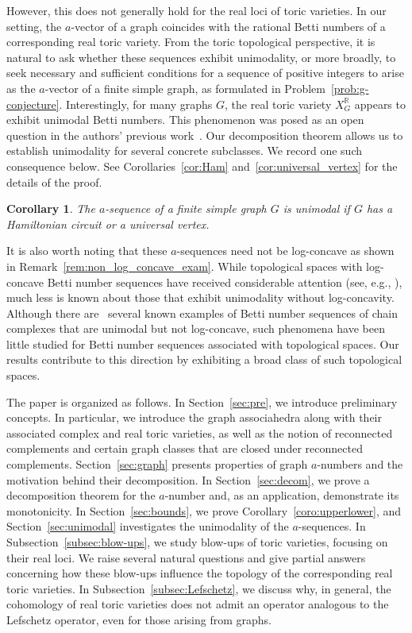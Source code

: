\documentclass[10pt]{amsart}
\theoremstyle{plain}
\newtheorem{corollary}[theorem]{Corollary}
\numberwithin{equation}{section}
\theoremstyle{definition}
\newcommand{\R}{\mathbb{R}}
\begin{document}
However, this does not generally hold for the real loci of toric varieties. 
In our setting, the $a$-vector of a graph coincides with the rational Betti numbers of a corresponding real toric variety.
From the toric topological perspective, it is natural to ask whether these sequences exhibit unimodality, or more broadly, to seek necessary and sufficient conditions for a sequence of positive integers to arise as the $a$-vector of a finite simple graph, as formulated in Problem~\ref{prob:g-conjecture}.
Interestingly, for many graphs $G$, the real toric variety $X^\R_G$ appears to exhibit unimodal Betti numbers. 
This phenomenon was posed as an open question in the authors' previous work~\cite{Choi-Yoon2026}.
Our decomposition theorem allows us to establish unimodality for several concrete subclasses.
We record one such consequence below. 
See Corollaries~\ref{cor:Ham} and~\ref{cor:universal_vertex} for the details of the proof.

\begin{corollary}
    The $a$-sequence of a finite simple graph $G$ is unimodal if $G$ has a Hamiltonian circuit or a universal vertex.
\end{corollary}

It is also worth noting that these $a$-sequences need not be log-concave as shown in Remark~\ref{rem:non_log_concave_exam}. 
While topological spaces with log-concave Betti number sequences have received considerable attention (see, e.g., \cite{Huh-Katz2012,Adiprasito-Huh-Katz2018,Gui-Xiong2024}), much less is known about those that exhibit unimodality without log-concavity.
Although there are~\cite{Cairns2009,Migliore-Zanello2018} several known examples of Betti number sequences of chain complexes that are unimodal but not log-concave, such phenomena have been little studied for Betti number sequences associated with topological spaces.
Our results contribute to this direction by exhibiting a broad class of such topological spaces.

The paper is organized as follows.
In Section~\ref{sec:pre}, we introduce preliminary concepts.
In particular, we introduce the graph associahedra along with their associated complex and real toric varieties, as well as the notion of reconnected complements and certain graph classes that are closed under reconnected complements.
Section~\ref{sec:graph} presents properties of graph $a$-numbers and the motivation behind their decomposition.
In Section~\ref{sec:decom}, we prove a decomposition theorem for the $a$-number and, as an application, demonstrate its monotonicity.
In Section~\ref{sec:bounds}, we prove Corollary~\ref{coro:upperlower}, and Section~\ref{sec:unimodal} investigates the unimodality of the $a$-sequences.
In Subsection~\ref{subsec:blow-ups}, we study blow-ups of toric varieties, focusing on their real loci.
We raise several natural questions and give partial answers concerning how these blow-ups influence the topology of the corresponding real toric varieties.
In Subsection~\ref{subsec:Lefschetz}, we discuss why, in general, the cohomology of real toric varieties does not admit an operator analogous to the Lefschetz operator, even for those arising from graphs.
\end{document}
